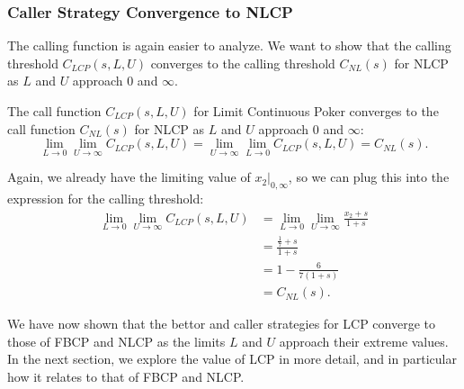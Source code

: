 \documentclass[../../main/main.tex]{subfiles}
\begin{document}
\subsubsection{Caller Strategy Convergence to NLCP}

The calling function is again easier to analyze. We want to show that the calling threshold $C_{LCP}(s, L, U)$ converges to the calling threshold $C_{NL}(s)$ for NLCP as $L$ and $U$ approach $0$ and $\infty$.
\begin{theorem}
    The call function $C_{LCP}(s, L, U)$ for Limit Continuous Poker converges to the call function $C_{NL}(s)$ for NLCP as $L$ and $U$ approach $0$ and $\infty$:
\[
\lim_{L \to 0} \lim_{U \to \infty} C_{LCP}(s, L, U) = \lim_{U \to \infty} \lim_{L \to 0} C_{LCP}(s, L, U) = C_{NL}(s).
\]
\end{theorem}
\begin{customproof}
Again, we already have the limiting value of $x_2|_{0,\infty}$, so we can plug this into the expression for the calling threshold:
\begin{align*}
    \lim_{L \to 0} \lim_{U \to \infty} C_{LCP}(s, L, U) & = \lim_{L \to 0} \lim_{U \to \infty} \frac{x_2+s}{1+s}\\
    & = \frac{\frac{1}{7}+s}{1+s}\\
    & = 1 - \frac{6}{7(1+s)}\\
    & = C_{NL}(s).
\end{align*}
\end{customproof}

We have now shown that the bettor and caller strategies for LCP converge to those of FBCP and NLCP as the limits $L$ and $U$ approach their extreme values. In the next section, we explore the value of LCP in more detail, and in particular how it relates to that of FBCP and NLCP.
\end{document}
